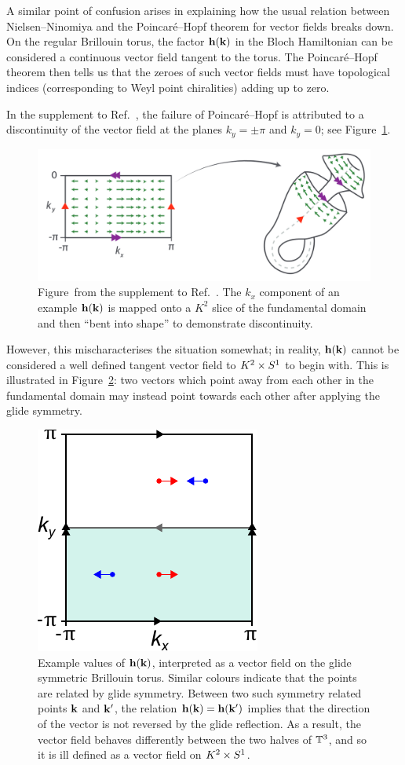 A similar point of confusion arises in explaining how the usual relation between Nielsen--Ninomiya and the Poincaré--Hopf theorem for vector fields breaks down. On the regular Brillouin torus, the factor $\vb{h}(\vb{k})$ in the Bloch Hamiltonian can be considered a continuous vector field tangent to the torus. The Poincaré--Hopf theorem then tells us that the zeroes of such vector fields must have topological indices (corresponding to Weyl point chiralities) adding up to zero.

In the supplement to Ref.~\cite{Fonseca-Vaidya_nonorientable}, the failure of Poincaré--Hopf is attributed to a discontinuity of the vector field at the planes $k_y=\pm\pi$ and $k_y=0$; see Figure~\ref{fig:Klein-discontinuity}.
\begin{figure}[htb!]
	\centering
	\includegraphics[width=.8\linewidth]{Images/Klein-discontinuity}
	\caption{Figure~from the supplement to Ref.~\cite{Fonseca-Vaidya_nonorientable}. The $k_x$ component of an example $\vb{h}(\vb{k})$ is mapped onto a $K^2$ slice of the fundamental domain and then ``bent into shape'' to demonstrate discontinuity.
	}
	\label{fig:Klein-discontinuity}
\end{figure}
However, this mischaracterises the situation somewhat; in reality, $\vb{h}(\vb{k})$ cannot be considered a well defined tangent vector field to $K^2\times S^1$ to begin with. This is illustrated in Figure~\ref{fig:BZ_vectors}: two vectors which point away from each other in the fundamental domain may instead point towards each other after applying the glide symmetry.
\begin{figure}[htb!]
	\centering
	\includegraphics[width=.3\linewidth]{Images/BZ_vectors}
	\caption{Example values of $\vb{h}(\vb{k})$, interpreted as a vector field on the glide symmetric Brillouin torus. Similar colours indicate that the points are related by glide symmetry. Between two such symmetry related points $\vb{k}$ and $\vb{k}'$, the relation $\vb{h}(\vb{k})=\vb{h}(\vb{k}')$ implies that the direction of the vector is not reversed by the glide reflection. As a result, the vector field behaves differently between the two halves of $\mathbb{T}^3$, and so it is ill defined as a vector field on $K^2\times S^1$.}
	\label{fig:BZ_vectors}
\end{figure}
